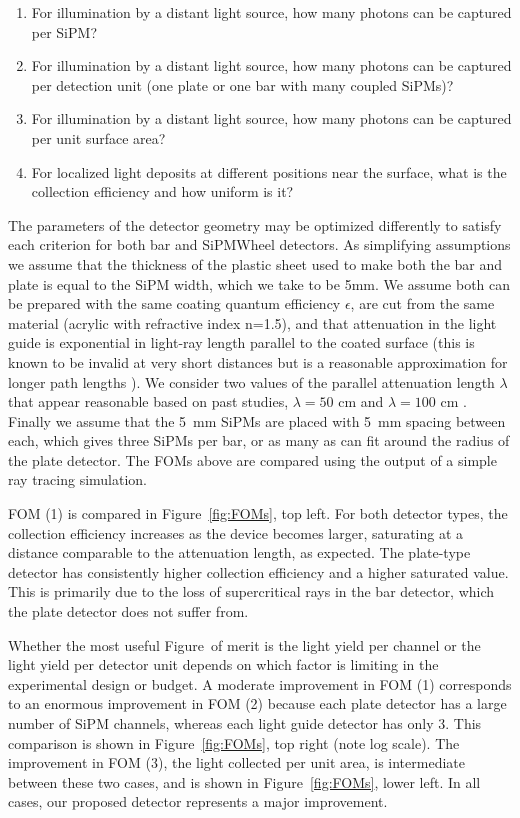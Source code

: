 \begin{enumerate}
\item For illumination by a distant light source, how many photons can be captured per SiPM?  
\item For illumination by a distant light source, how many photons can be captured per detection unit (one plate or one bar with many coupled SiPMs)?  
\item For illumination by a distant light source, how many photons can be captured per unit surface area?  
\item For localized light deposits at different positions near the surface, what is the collection efficiency and how uniform is it?
\end{enumerate}

The parameters of the detector geometry may be optimized differently to satisfy each criterion for both bar and SiPMWheel detectors.  As simplifying assumptions we assume that the thickness of the plastic sheet used to make both the bar and plate is equal to the SiPM width, which we take to be 5mm.  We assume both can be prepared with the same coating quantum efficiency $\epsilon$, are cut from the same material (acrylic with refractive index n=1.5), and that attenuation in the light guide is exponential in light-ray length parallel to the coated surface (this is known to be invalid at very short distances but is a reasonable approximation for longer path lengths \cite{Jones:2013sfa}).  We consider two values of the parallel attenuation length $\lambda$ that appear reasonable based on past studies, $\lambda=50$ cm and $\lambda=100$ cm \cite{Moss:2014ota,Jones:2013sfa}.  Finally we assume that the 5~mm SiPMs are placed with 5~mm spacing between each, which gives three SiPMs per bar, or as many as can fit around the radius of the plate detector.  The FOMs above are compared using the output of a simple ray tracing simulation.

FOM (1) is compared in Figure~\ref{fig:FOMs}, top left.   For both detector types, the collection efficiency increases as the device becomes larger, saturating at a distance comparable to the attenuation length, as expected.   The plate-type detector has consistently higher collection efficiency and a higher saturated value.  This is primarily due to the loss of supercritical rays in the bar detector, which the plate detector does not suffer from.

Whether the most useful Figure~of merit is the light yield per channel or the light yield per detector unit depends on which factor is limiting in the experimental design or budget.  A moderate improvement in FOM (1) corresponds to an enormous improvement in FOM (2) because each plate detector has a large number of SiPM channels, whereas each light guide detector has only 3. This comparison is shown in Figure~\ref{fig:FOMs}, top right (note log scale).  The improvement in FOM (3), the light collected per unit area, is intermediate between these two cases, and is shown in Figure~\ref{fig:FOMs}, lower left.  In all cases, our proposed detector represents a major improvement.

